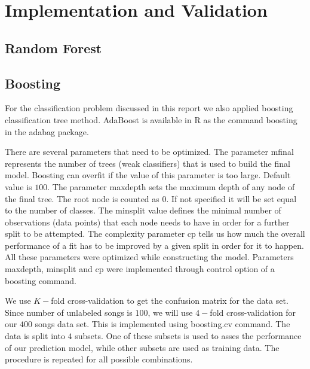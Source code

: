 \documentclass{article}
\begin{document}
\section{Implementation and Validation}

\subsection{Random Forest}

\subsection{Boosting}

For the classification problem discussed in this report we also applied boosting classification tree method. AdaBoost is available in R as the command {\selectfont boosting} in the {\selectfont adabag} package.

There are several parameters that need to be optimized. The parameter {\selectfont mfinal} represents the number of trees (weak classifiers) that is used to build the final model. Boosting can overfit if the value of this parameter is too large. Default value is $100$. The parameter {\selectfont maxdepth} sets the maximum depth of any node of the final tree. The root node is counted as $0$. If not specified it will be set equal to the number of classes. The {\selectfont minsplit} value defines the minimal number of observations (data points) that each node needs to have in order for a further split to be attempted. The complexity parameter {\selectfont cp} tells us how much the overall performance of a fit has to be improved by a given split in order for it to happen. All these parameters were optimized while constructing the model. Parameters {\selectfont maxdepth}, {\selectfont minsplit} and {\selectfont cp} were implemented through {\selectfont control} option of a {\selectfont boosting} command.

We use $K-$fold cross-validation to get the confusion matrix for the data set. Since number of unlabeled songs is $100$, we will use $4-$fold cross-validation for our $400$ songs data set. This is implemented using {\selectfont boosting.cv} command. The data is split into $4$ subsets. One of these subsets is used to asses the performance of our prediction model, while other subsets are used as training data. The procedure is repeated for all possible combinations.
\end{document}
